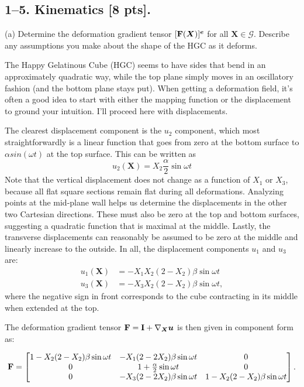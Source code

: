 \bigskip
\subsection*{1--5. \textbf{Kinematics} [8 pts].}

(a) Determine the deformation gradient tensor $[\mathbf{F}(\bm{X})]^{\bm{e}}$ for all $\bm{X}\in \mathcal{G}$. 
Describe any assumptions you make about the shape of the HGC as it deforms. 

The Happy Gelatinous Cube (HGC) seems to have sides that bend in an approximately quadratic way, while the top plane simply moves in an oscillatory fashion (and the bottom plane stays put). 
When getting a deformation field, it's often a good idea to start with either the mapping function or the displacement to ground your intuition. 
I'll proceed here with displacements. 

The clearest displacement component is the $u_2$ component, which most straightforwardly is a linear function that goes from zero at the bottom surface to $\alpha sin(\omega t)$ at the top surface. 
This can be written as
\begin{equation*}
    u_2(\bm{X}) =  X_2 \frac{\alpha}{2} \sin\omega t 
\end{equation*}
Note that the vertical displacement does not change as a function of $X_1$ or $X_3$, because all flat square sections remain flat during all deformations.
Analyzing points at the mid-plane wall helps us determine the displacements in the other two Cartesian directions. 
These must also be zero at the top and bottom surfaces, suggesting a quadratic function that is maximal at the middle. 
Lastly, the transverse displacements can reasonably be assumed to be zero at the middle and linearly increase to the outside. 
In all, the displacement components $u_1$ and $u_3$ are:
\begin{align*}
    u_1(\bm{X}) &= -X_1 X_2 (2-X_2)\beta \sin\omega t\\
    u_3(\bm{X}) &= -X_3 X_2 (2-X_2)\beta \sin\omega t,
\end{align*}
where the negative sign in front corresponds to the cube contracting in its middle when extended at the top.

The deformation gradient tensor $\mathbf{F} = \mathbf{I} + \nabla_{\bm{X}} \bm{u}$ is then given in component form as:

\begin{equation*}
\mathbf{F} = \begin{bmatrix}
 1 - X_2 (2-X_2)\beta \sin\omega t & -X_1 (2-2X_2) \beta \sin\omega t & 0 \\
 0 & 1 + \frac{\alpha}{2} \sin\omega t & 0 \\
 0 & -X_3 (2-2X_2) \beta \sin\omega t & 1- X_2 (2-X_2)\beta \sin\omega t
 \end{bmatrix}. 
\end{equation*}

